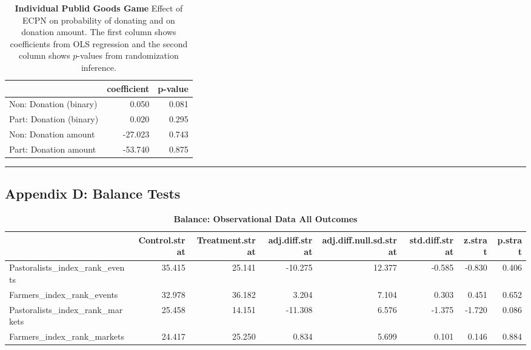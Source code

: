 \documentclass[
]{article}
\begin{document}
\begin{table}[H]
\begin{center}
\label{tab:pgg_tab_ind}
\caption{\textbf{Individual Publid Goods Game} Effect of ECPN on probability of donating and on donation amount. The first column shows coefficients from OLS regression and the second column shows $p$-values from randomization inference.}
\smallskip

\begin{tabular}{l|r|r}
\hline
  & coefficient & p-value\\
\hline
Non: Donation (binary) & 0.050 & 0.081\\
\hline
Part: Donation (binary) & 0.020 & 0.295\\
\hline
Non: Donation amount & -27.023 & 0.743\\
\hline
Part: Donation amount & -53.740 & 0.875\\
\hline
\end{tabular}


\end{center}
\end{table}

\begin{center}\rule{0.5\linewidth}{0.5pt}\end{center}

\hypertarget{appendix-d-balance-tests}{%
\subsection{Appendix D: Balance Tests}\label{appendix-d-balance-tests}}

\begin{table}[H]
\begin{center}
\label{tab:bal_obs_tab1}
\caption{\textbf{Balance: Observational Data All Outcomes}}
\smallskip

\begin{tabular}{l|r|r|r|r|r|r|r}
\hline
  & Control.strat & Treatment.strat & adj.diff.strat & adj.diff.null.sd.strat & std.diff.strat & z.strat & p.strat\\
\hline
Pastoralists\_index\_rank\_events & 35.415 & 25.141 & -10.275 & 12.377 & -0.585 & -0.830 & 0.406\\
\hline
Farmers\_index\_rank\_events & 32.978 & 36.182 & 3.204 & 7.104 & 0.303 & 0.451 & 0.652\\
\hline
Pastoralists\_index\_rank\_markets & 25.458 & 14.151 & -11.308 & 6.576 & -1.375 & -1.720 & 0.086\\
\hline
Farmers\_index\_rank\_markets & 24.417 & 25.250 & 0.834 & 5.699 & 0.101 & 0.146 & 0.884\\
\hline
\end{tabular}


\end{center}
\end{table}
\end{document}
